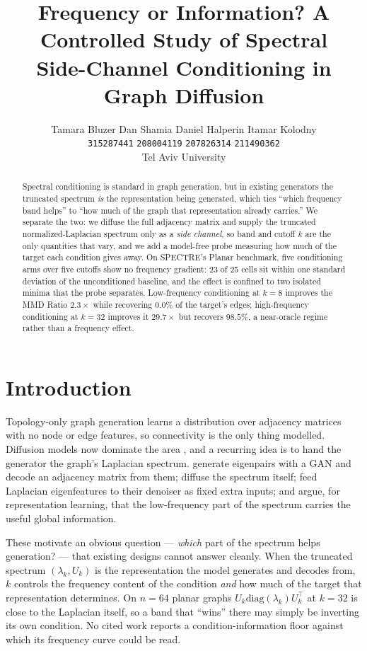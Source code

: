 \documentclass[11pt]{article}
\title{Frequency or Information? A Controlled Study of Spectral\\Side-Channel Conditioning in Graph Diffusion}
\author{
  Tamara Bluzer \quad Dan Shamia \quad Daniel Halperin \quad Itamar Kolodny \\
  \texttt{315287441} \quad \texttt{208004119} \quad \texttt{207826314} \quad \texttt{211490362} \\
  Tel Aviv University
}
\begin{document}
\maketitle

\begin{abstract}
Spectral conditioning is standard in graph generation, but in existing generators the truncated
spectrum \emph{is} the representation being generated, which ties ``which frequency band helps''
to ``how much of the graph that representation already carries.'' We separate the two: we diffuse
the full adjacency matrix and supply the truncated normalized-Laplacian spectrum only as a
\emph{side channel}, so band and cutoff $k$ are the only quantities that vary, and we add a model-free probe measuring how much of the target each condition gives away. On SPECTRE's Planar benchmark, five conditioning arms over five cutoffs show no
frequency gradient: 23 of 25 cells sit within one standard deviation of the unconditioned
baseline, and the effect is confined to two isolated minima that the probe separates. Low-frequency conditioning at $k{=}8$
improves the MMD Ratio $2.3\times$ while recovering $0.0\%$ of the target's edges; high-frequency
conditioning at $k{=}32$ improves it $29.7\times$ but recovers $98.5\%$, a near-oracle
regime rather than a frequency effect.
\end{abstract}

\section{Introduction}
\label{sec:intro}

Topology-only graph generation learns a distribution over adjacency matrices with no node or edge
features, so connectivity is the only thing modelled. Diffusion models now
dominate the area \citep{niu2020edpgnn,jo2022gdss,vignac2023digress}, and a recurring idea is to
hand the generator the graph's Laplacian spectrum. \citet{martinkus2022spectre} generate
eigenpairs with a GAN and decode an adjacency matrix from them; \citet{minello2025ggsd} diffuse
the spectrum itself; \citet{vignac2023digress} feed Laplacian eigenfeatures to their denoiser as
fixed extra inputs; and \citet{zhu2025sdmg} argue, for representation learning, that the
low-frequency part of the spectrum carries the useful global information.

These motivate an obvious question --- \emph{which} part of the spectrum helps generation? ---
that existing designs cannot answer cleanly. When the truncated spectrum $(\lambda_k,
U_k)$ is the representation the model generates and decodes from, $k$ controls the frequency
content of the condition \emph{and} how much of the target that representation
determines. On $n{=}64$ planar graphs $U_k \mathrm{diag}(\lambda_k) U_k^\top$ at $k{=}32$ is close
to the Laplacian itself, so a band that ``wins'' there may simply be inverting its own condition.
No cited work reports a condition-information floor against which its frequency curve could be
read.
\end{document}
